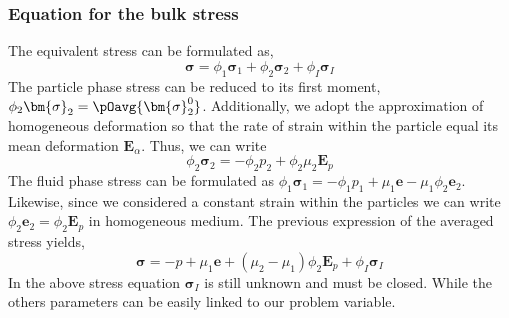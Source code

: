 \subsubsection*{Equation for the bulk stress}

The equivalent stress can be formulated as, 
\begin{equation*}
    \bm{\sigma}
    = 
    \phi_1 \bm{\sigma}_1
    + \phi_2 \bm{\sigma}_2
    + \phi_I \bm{\sigma}_I
    \label{eq:sigma_def}
\end{equation*}
The particle phase stress can be reduced to its first moment, $\phi_2 \bm{\sigma}_2 = \pOavg{\bm{\sigma}_2^0}$.
Additionally, we adopt the approximation of homogeneous deformation so that the rate of strain within the particle equal its mean deformation $\textbf{E}_\alpha$.
Thus, we can write 
\begin{equation*}
    \phi_2 \bm{\sigma}_2 
    = - \phi_2 p_2
    + \phi_2 \mu_2 \textbf{E}_p
\end{equation*}
The fluid phase stress can be formulated as $\phi_1 \bm{\sigma}_1 =  - \phi_1 p_1 + \mu_1 \textbf{e} - \mu_1 \phi_2 \textbf{e}_2$.
Likewise, since we considered a constant strain within the particles we can write $\phi_2\textbf{e}_2 = \phi_2 \textbf{E}_p$ in homogeneous medium.   
The previous expression of the averaged stress yields, 
\begin{equation*}
    \bm{\sigma}
    = 
    - p 
    + \mu_1 \textbf{e} 
    + (\mu_2 - \mu_1) \phi_2 \textbf{E}_p
    + \phi_I \bm{\sigma}_I
    \label{eq:sigma_def}
\end{equation*}
In the above stress equation $\bm{\sigma}_I$ is still unknown and must be closed. 
While the others parameters can be easily linked to our problem variable. 

